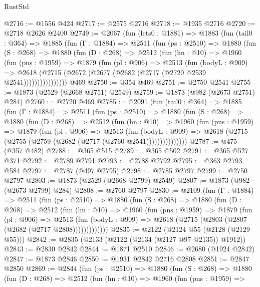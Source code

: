\begin{lexlean}{RustStd}
\begin{coremodule}
@2716 := @1556 @424
@2717 := @2575 @2716
@2718 := @1935 @2716
@2720 := @2718 @2626 @2400
@2749 := @2067
    (fun (lets0 : @1881) =>
    @1883
      (fun (tail0 : @364) =>
      @1885
        (fun (Γ : @1884) =>
        @2511
          (fun (ps : @2510) =>
          @1880
            (fun (S : @268) =>
            @1880
              (fun (D : @268) =>
              @2512
                (fun (hn : @10) =>
                @1960
                  (fun (pns : @1959) =>
                  @1879
                    (fun (pl : @906) =>
                    @2513
                      (fun (bodyL : @909) =>
                      @2618 (@2715 (@2672 (@2677 (@2682 (@2717 (@2720 @2539 @2541))))))))))))))))
    @469
@2750 := @354 @469
@2751 := @2750 @2541
@2755 := @1873 (@2529 (@2668 @2751) @2549)
@2759 := @1873 (@982 (@2673 @2751) @284)
@2760 := @2720 @469
@2785 := @2091
    (fun (tail0 : @364) =>
    @1885
      (fun (Γ : @1884) =>
      @2511
        (fun (ps : @2510) =>
        @1880
          (fun (S : @268) =>
          @1880
            (fun (D : @268) =>
            @2512
              (fun (hn : @10) =>
              @1960
                (fun (pns : @1959) =>
                @1879
                  (fun (pl : @906) =>
                  @2513
                    (fun (bodyL : @909) =>
                    @2618 (@2715 (@2755 (@2759 (@2682 (@2717 (@2760 @2541)))))))))))))))
@2787 := @475 (@357 @482)
@2788 := @365 @515
@2789 := @365 @502
@2791 := @365 @527 @371
@2792 := @2789 @2791
@2793 := @2788 @2792
@2795 := @363 @2793 @584
@2797 := @2787 (@497 @2795)
@2798 := @2785 @2797
@2799 := @2750 @2797
@2803 := @1873 (@2529 (@2668 @2799) @2549)
@2807 := @1873 (@982 (@2673 @2799) @284)
@2808 := @2760 @2797
@2830 := @2109
    (fun (Γ : @1884) =>
    @2511
      (fun (ps : @2510) =>
      @1880
        (fun (S : @268) =>
        @1880
          (fun (D : @268) =>
          @2512
            (fun (hn : @10) =>
            @1960
              (fun (pns : @1959) =>
              @1879
                (fun (pl : @906) =>
                @2513
                  (fun (bodyL : @909) => @2618 (@2715 (@2803 (@2807 (@2682 (@2717 @2808)))))))))))))
@2835 := @2122 (@2124 @55 (@2128 (@2129 @55)))
@2842 := @2835 (@2133 (@2122 (@2134 (@2127 @97 @2135)) @1912))
@2843 := @2830 @2842
@2844 := @1871 @2510
@2846 := @2680 (@1924 @2842)
@2847 := @1873 @2846
@2850 := @1931 @2842 @2716 @2808
@2851 := @2847 @2850
@2869 := @2844
    (fun (ps : @2510) =>
    @1880
      (fun (S : @268) =>
      @1880
        (fun (D : @268) =>
        @2512
          (fun (hn : @10) =>
          @1960
            (fun (pns : @1959) =>

\end{coremodule}
\end{lexlean}
